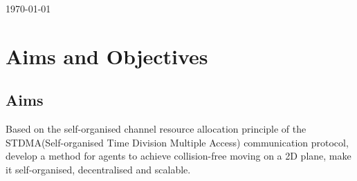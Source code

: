 \documentclass[12pt, oneside]{article}
\begin{document}
\begin{titlepage}
\begin{center}
        \vspace{0.8cm}
 
        \vspace{0.8cm}
        \today
        
    \end{center}
    
\end{titlepage}

\tableofcontents
\pagebreak

\section{Aims and Objectives}
\subsection{Aims}
Based on the self-organised channel resource allocation principle of the STDMA(Self-organised Time Division Multiple Access) \cite{STDMA} communication protocol, develop a method for agents to achieve collision-free moving on a 2D plane, make it self-organised, decentralised and scalable. 
\end{document}
